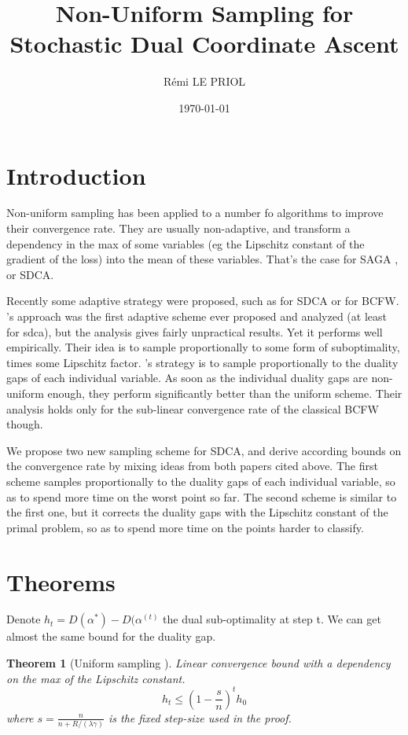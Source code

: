 \documentclass{article}
\title{Non-Uniform Sampling for \\ Stochastic Dual Coordinate Ascent}
\author{R\'emi LE PRIOL}
\affil{Montreal Institute of Learning Algorithms}
\date{\today}
\DeclareMathOperator{\1}{\mathbb{1}}
\newtheorem{theorem}{Theorem}
\begin{document}
\maketitle

\section{Introduction}

Non-uniform sampling has been applied to a number fo algorithms to improve their convergence rate. 
They are usually non-adaptive, and transform a dependency in the max of some variables (eg the Lipschitz constant of the gradient of the loss) into  the mean of these variables.
That's the case for SAGA \cite{schmidt2015non}, or SDCA\cite{richtarik}.

Recently some adaptive strategy were proposed, such as \cite{csiba2015stochastic} for SDCA or \cite{osokin2016minding} for BCFW.
\cite{csiba2015stochastic} 's approach was the first adaptive scheme ever proposed and analyzed (at least for sdca), but the analysis gives fairly unpractical results.
Yet it performs well empirically.
Their idea is to sample proportionally to some form of suboptimality, times some Lipschitz factor.
\cite{osokin2016minding} 's strategy is to sample proportionally to the duality gaps of each individual variable. 
As soon as the individual duality gaps are non-uniform enough, they perform significantly better than the uniform scheme.
Their analysis holds only for the sub-linear convergence rate of the classical BCFW though. 

We propose two new sampling scheme for SDCA, and derive according bounds on the convergence rate by mixing ideas from both papers cited above. 
The first scheme samples proportionally to the duality gaps of each individual  variable, so as to spend more time on the worst point so far.
The second scheme is similar to the first one, but it corrects the duality gaps with the Lipschitz constant of the primal problem, so as to spend more time on the points harder to classify.

\section{Theorems}

Denote $h_t = D(\alpha^*) - D(\alpha^{(t)}$ the dual sub-optimality at step t. We can get almost the same bound for the duality gap.

\begin{theorem}[Uniform sampling \cite{shalev-shwartz_accelerated_2013-1}]
	\label{uniform}
	Linear convergence bound with a dependency on the max of the Lipschitz constant.
	\begin{equation}
		h_t \leq (1-\frac{s}{n})^t  h_0
	\end{equation}
	where $ s = \frac{n}{n+R/(\lambda \gamma)} $ is the fixed step-size used in the proof. 
\end{theorem}
\end{document}
